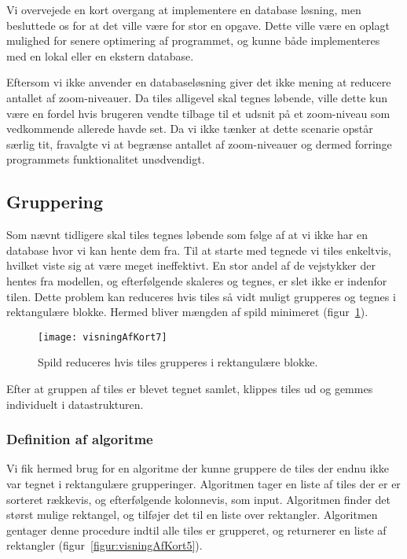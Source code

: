 Vi overvejede en kort overgang at implementere en database løsning, men besluttede os for at det ville være for stor en opgave. Dette ville være en oplagt mulighed for senere optimering af programmet, og kunne både implementeres med en lokal eller en ekstern database.

Eftersom vi ikke anvender en databaseløsning giver det ikke mening at reducere antallet af zoom-niveauer. Da tiles alligevel skal tegnes løbende, ville dette kun være en fordel hvis brugeren vendte tilbage til et udsnit på et zoom-niveau som vedkommende allerede havde set. Da vi ikke tænker at dette scenarie opstår særlig tit, fravalgte vi at begrænse antallet af zoom-niveauer og dermed forringe programmets funktionalitet unødvendigt.

\subsection{Gruppering}
\label{subsec:gruppering}

Som nævnt tidligere skal tiles tegnes løbende som følge af at vi ikke har en database hvor vi kan hente dem fra. Til at starte med tegnede vi tiles enkeltvis, hvilket viste sig at være meget ineffektivt. En stor andel af de vejstykker der hentes fra modellen, og efterfølgende skaleres og tegnes, er slet ikke er indenfor tilen. Dette problem kan reduceres hvis tiles så vidt muligt grupperes og tegnes i rektangulære blokke. Hermed bliver mængden af spild minimeret (figur~\ref{figur:visningAfKort7}).

\begin{figure}[h]
	\centering
	\texttt{[image: visningAfKort7]}
	\captionsetup{width=0.8\textwidth}
	\caption{Spild reduceres hvis tiles grupperes i rektangulære blokke.}
	\label{figur:visningAfKort7}
\end{figure}

Efter at gruppen af tiles er blevet tegnet samlet, klippes tiles ud og gemmes individuelt i datastrukturen.

\subsubsection{Definition af algoritme}
\label{subsec:definitionAfAlgoritme}

Vi fik hermed brug for en algoritme der kunne gruppere de tiles der endnu ikke var tegnet i rektangulære grupperinger. Algoritmen tager en liste af tiles der er er sorteret rækkevis, og efterfølgende kolonnevis, som input. Algoritmen finder det størst mulige rektangel, og tilføjer det til en liste over rektangler. Algoritmen gentager denne procedure indtil alle tiles er grupperet, og returnerer en liste af rektangler (figur~\ref{figur:visningAfKort5}).

